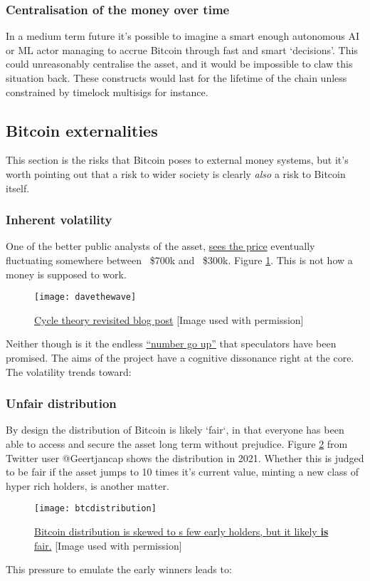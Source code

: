 \begin{itemize}
\subsubsection{Centralisation of the money over time}
In a medium term future it's possible to imagine a smart enough autonomous AI or ML actor managing to accrue Bitcoin through fast and smart `decisions'. This could unreasonably centralise the asset, and it would be impossible to claw this situation back. These constructs would last for the lifetime of the chain unless constrained by timelock multisigs for instance. 
\subsection{Bitcoin externalities}
This section is the risks that Bitcoin poses to external money systems, but it's worth pointing out that a risk to wider society is clearly \textit{also} a risk to Bitcoin itself.
\subsubsection{Inherent volatility}
One of the better public analysts of the asset, \href{https://twitter.com/davthewave/status/1072441941390974982/photo/1}{sees the price} eventually fluctuating somewhere between ~\$700k and ~\$300k.  Figure \ref{fig:davethewave}. This is not how a money is supposed to work.  

\begin{figure}
  \centering
    \texttt{[image: davethewave]}
  \caption{\href{https://davethewave.substack.com/p/cycle-theory-revisited?s=r}{Cycle theory revisited blog post} [Image used with permission]}
  \label{fig:davethewave}
\end{figure}

Neither though is it the endless \href{https://stephanlivera.com/episode/147/}{``number go up''} that speculators have been promised. The aims of the project have a cognitive dissonance right at the core. The volatility trends toward:
\subsubsection{Unfair distribution}
By design the distribution of Bitcoin is likely `fair`, in that everyone has been able to access and secure the asset long term without prejudice. Figure \ref{fig:btcdistribution} from Twitter user @Geertjancap shows the distribution in 2021. Whether this is judged to be fair if the asset jumps to 10 times it's current value, minting a new class of hyper rich holders, is another matter. 
\begin{figure}
  \centering
    \texttt{[image: btcdistribution]}
  \caption{\href{https://twitter.com/Geertjancap/status/1380972132990136322/photo/1}{Bitcoin distribution is skewed to s few early holders, but it likely \textbf{is} fair.} [Image used with permission]}
  \label{fig:btcdistribution}
\end{figure}
This pressure to emulate the early winners leads to:

\end{itemize}
